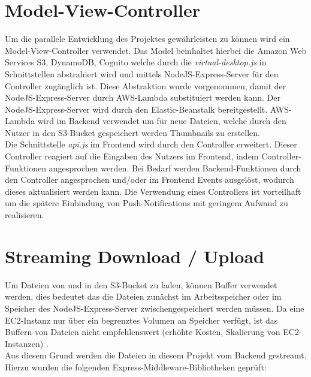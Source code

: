 \documentclass[a4paper, 12pt]{scrreprt}
\renewcommand\_{\textunderscore\allowbreak}
\begin{document}
\section{Model-View-Controller}

Um die parallele Entwicklung des Projektes gewährleisten zu können wird ein Model-View-Controller verwendet. Das Model beinhaltet hierbei die Amazon Web Services S3, DynamoDB, Cognito welche durch die \textit{virtual-desktop.js} in Schnittstellen abstrahiert wird und mittels NodeJS-Express-Server für den Controller zugänglich ist. Diese Abstraktion wurde vorgenommen, damit der NodeJS-Express-Server durch AWS-Lambda substituiert werden kann. Der NodeJS-Express-Server wird durch den Elastic-Beanstalk bereitgestellt. AWS-Lambda wird im Backend verwendet um für neue Dateien, welche durch den Nutzer in den S3-Bucket gespeichert werden Thumbnails zu erstellen.\\
Die Schnittstelle \textit{api.js} im Frontend wird durch den Controller erweitert. Dieser Controller reagiert auf die Eingaben des Nutzers im Frontend, indem Controller-Funktionen angesprochen werden. Bei Bedarf werden Backend-Funktionen durch den Controller angesprochen und/oder im Frontend Events ausgelöst, wodurch dieses aktualisiert werden kann.
Die Verwendung eines Controllers ist vorteilhaft um die spätere Einbindung von Push-Notifications mit geringem Aufwand zu realisieren.



\section{Streaming Download / Upload}

Um Dateien von und in den S3-Bucket zu laden, können Buffer verwendet werden, dies bedeutet das die Dateien zunächst im Arbeitsspeicher oder im Speicher des NodeJS-Express-Server zwischengespeichert werden müssen. Da eine EC2-Instanz nur über ein begrenztes Volumen an Speicher verfügt, ist das Buffern von Dateien nicht empfehlenswert (erhöhte Kosten, Skalierung von EC2-Instanzen) \cite{AWS}.\\
Aus diesem Grund werden die Dateien in diesem Projekt vom Backend gestreamt. Hierzu wurden die folgenden Express-Middleware-Bibliotheken geprüft:
\end{document}
